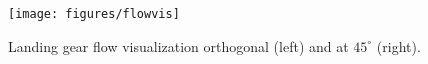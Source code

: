 \begin{figure}
	\begin{center}
		\centerline{\texttt{[image: figures/flowvis]}}
		\caption{Landing gear flow visualization orthogonal (left) and at $45^\circ$ (right).}
		\label{fig:flowvis}
	\end{center}
\end{figure}




%

